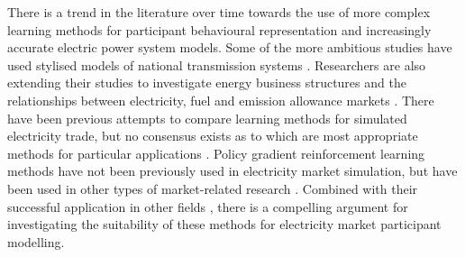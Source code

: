 There is a trend in the literature over time towards the use of more complex
learning methods for participant behavioural representation and increasingly
accurate electric power system models.  Some of the more ambitious studies have
used stylised models of national transmission systems
\cite{cincotti:09,viet:06}. Researchers are also extending their studies to
investigate energy business structures and the relationships between
electricity, fuel and emission allowance markets \cite{krause:gas,wang:09}.
There have been previous attempts to compare learning methods for simulated
electricity trade, but no consensus exists as to which are most appropriate
methods for particular applications \cite{visud:thesis,weidlich:08}. Policy
gradient reinforcement learning methods have not been previously used in
electricity market simulation, but have been used in other types of
market-related research \cite{moody:98,moody:direct,vengerov:grid}. Combined
with their successful application in other fields
\cite{shaal:robots,peshkin:routing,benbrahim:1996}, there is a compelling
argument for investigating the suitability of these methods for electricity
market participant modelling.
